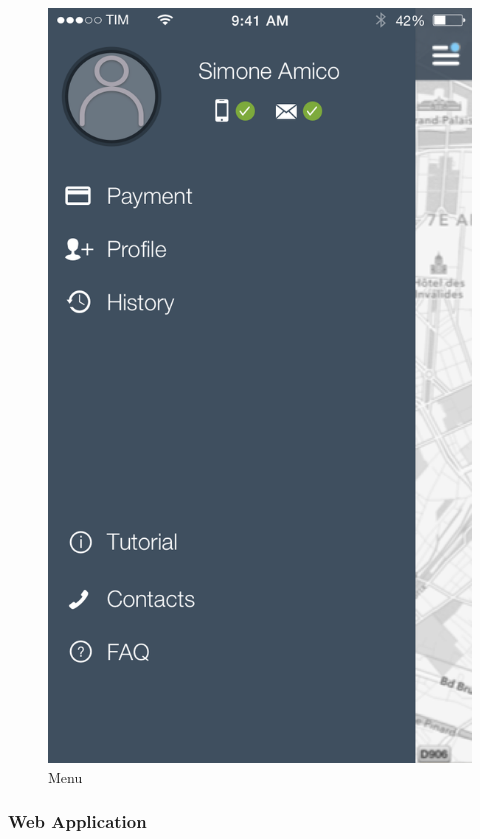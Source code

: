 \documentclass[12pt]{article}
\begin{document}
\begin{figure}
 	 	  \includegraphics[scale=0.25]{Images/Menu.png}
		  \caption{Menu}
		  \endminipage
 	 	\end{figure}
 	 	
 	 \FloatBarrier
 	 \subsubsection{Web Application}

 	 	
		
	 	 
\end{document}
